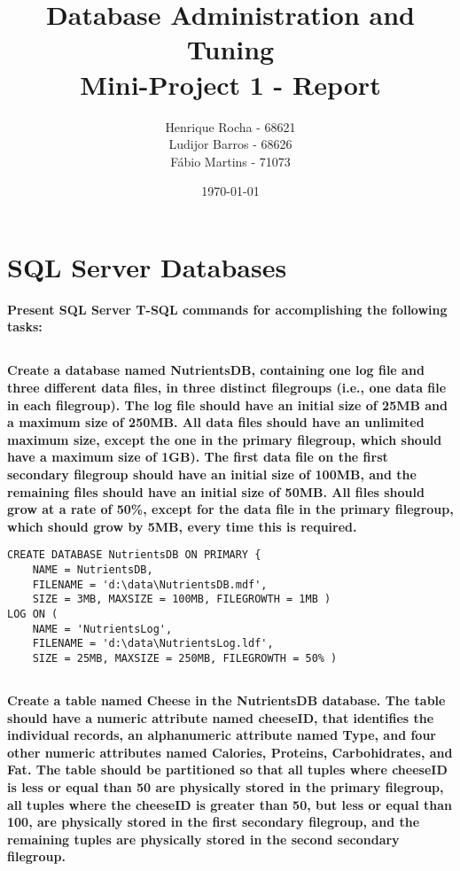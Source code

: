 \documentclass[11pt,report]{article}
\title{	Database Administration and Tuning \\ Mini-Project 1 - Report}
\author{
	Henrique Rocha - 68621 \\
	Ludijor Barros - 68626 \\
	Fábio Martins - 71073
}
\date{\today}
\begin{document}
	\maketitle
\section{SQL Server Databases}
	\textbf{Present SQL Server T-SQL commands for accomplishing the following tasks:}
	\subsection{}
	\textbf{Create a database named NutrientsDB, containing one log file and three different data files, in three distinct filegroups (i.e., one data file in each filegroup). The log file should have an initial size of 25MB and a maximum size of 250MB. All data files should have an unlimited maximum size, except the one in the primary filegroup, which should have a maximum size of 1GB). The first data file on the first secondary filegroup should have an initial size of 100MB, and the remaining files should have an initial size of 50MB. All files should grow at a rate of 50\%, except for the data file in the primary filegroup, which should grow by 5MB, every time this is required.}

\begin{lstlisting}
CREATE DATABASE NutrientsDB ON PRIMARY {
	NAME = NutrientsDB,
	FILENAME = 'd:\data\NutrientsDB.mdf',
	SIZE = 3MB, MAXSIZE = 100MB, FILEGROWTH = 1MB )
LOG ON (
	NAME = 'NutrientsLog',
	FILENAME = 'd:\data\NutrientsLog.ldf',
	SIZE = 25MB, MAXSIZE = 250MB, FILEGROWTH = 50% )
\end{lstlisting}

	\subsection{}
	\textbf{Create a table named Cheese in the NutrientsDB database. The table should have a numeric attribute named cheeseID, that identifies the individual records, an alphanumeric attribute named Type, and four other numeric attributes named Calories, Proteins, Carbohidrates, and Fat. The table should be partitioned so that all tuples where cheeseID is less or equal than 50 are physically stored in the primary filegroup, all tuples where the cheeseID is greater than 50, but less or equal than 100, are physically stored in the first secondary filegroup, and the remaining tuples are physically stored in the second secondary filegroup.}
\end{document}
